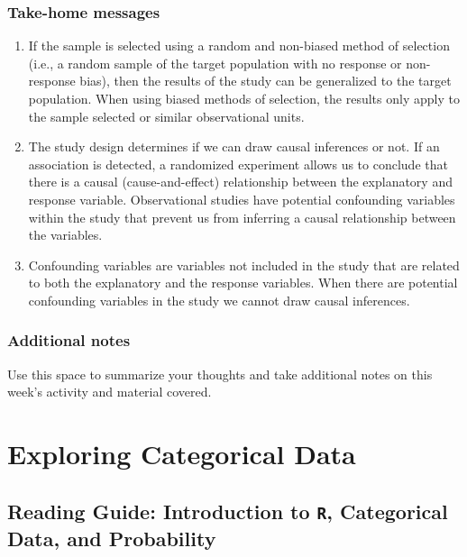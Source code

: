 \documentclass[
]{report}
\begin{document}
\vspace{0.8in}

\hypertarget{take-home-messages-1}{%
\subsection{Take-home messages}\label{take-home-messages-1}}

\begin{enumerate}
\def\labelenumi{\arabic{enumi}.}
\item
  If the sample is selected using a random and non-biased method of selection (i.e., a random sample of the target population with no response or non-response bias), then the results of the study can be generalized to the target population. When using biased methods of selection, the results only apply to the sample selected or similar observational units.
\item
  The study design determines if we can draw causal inferences or not. If an association is detected, a randomized experiment allows us to conclude that there is a causal (cause-and-effect) relationship between the explanatory and response variable. Observational studies have potential confounding variables within the study that prevent us from inferring a causal relationship between the variables.
\item
  Confounding variables are variables not included in the study that are related to both the explanatory and the response variables. When there are potential confounding variables in the study we cannot draw causal inferences.
\end{enumerate}

\hypertarget{additional-notes-1}{%
\subsection{Additional notes}\label{additional-notes-1}}

Use this space to summarize your thoughts and take additional notes on this week's activity and material covered.

\hypertarget{exploring-categorical-data}{%
\chapter{Exploring Categorical Data}\label{exploring-categorical-data}}

\hypertarget{reading-guide-introduction-to-r-categorical-data-and-probability}{%
\section{\texorpdfstring{Reading Guide: Introduction to \texttt{R}, Categorical Data, and Probability}{Reading Guide: Introduction to R, Categorical Data, and Probability}}\label{reading-guide-introduction-to-r-categorical-data-and-probability}}
\end{document}

